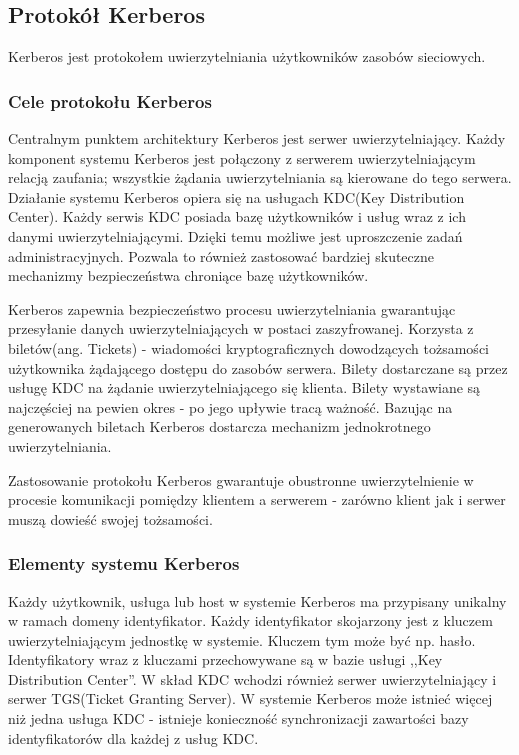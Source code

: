 	\subsection{Protokół Kerberos}

		Kerberos jest protokołem uwierzytelniania użytkowników zasobów sieciowych.

		\subsubsection{Cele protokołu Kerberos}

			Centralnym punktem architektury Kerberos jest serwer uwierzytelniający\cite{Garman03}. Każdy komponent systemu Kerberos jest połączony z serwerem uwierzytelniającym relacją zaufania; wszystkie żądania uwierzytelniania są kierowane do tego serwera. Działanie systemu Kerberos opiera się na usługach KDC(Key Distribution Center). Każdy serwis KDC posiada bazę użytkowników i usług wraz z ich danymi uwierzytelniającymi. Dzięki temu możliwe jest uproszczenie zadań administracyjnych. Pozwala to również zastosować bardziej skuteczne mechanizmy bezpieczeństwa chroniące bazę użytkowników.

			Kerberos zapewnia bezpieczeństwo procesu uwierzytelniania gwarantując przesyłanie danych uwierzytelniających w postaci zaszyfrowanej. Korzysta z biletów(ang. Tickets) - wiadomości kryptograficznych dowodzących tożsamości użytkownika żądającego dostępu do zasobów serwera. Bilety dostarczane są przez usługę KDC na żądanie uwierzytelniającego się klienta. Bilety wystawiane są najczęściej na pewien okres - po jego upływie tracą ważność. Bazując na generowanych biletach Kerberos dostarcza mechanizm jednokrotnego uwierzytelniania. 

			Zastosowanie protokołu Kerberos gwarantuje obustronne uwierzytelnienie w procesie komunikacji pomiędzy klientem a serwerem - zarówno klient jak i serwer muszą dowieść swojej tożsamości. 

		\subsubsection{Elementy systemu Kerberos}

			Każdy użytkownik, usługa lub host w systemie Kerberos ma przypisany unikalny w ramach domeny identyfikator\cite{Garman03}. Każdy identyfikator skojarzony jest z kluczem uwierzytelniającym jednostkę w systemie. Kluczem tym może być np. hasło. Identyfikatory wraz z kluczami przechowywane są w bazie usługi ,,Key Distribution Center''. W skład KDC wchodzi również serwer uwierzytelniający i serwer TGS(Ticket Granting Server). W systemie Kerberos może istnieć więcej niż jedna usługa KDC - istnieje konieczność synchronizacji zawartości bazy identyfikatorów dla każdej z usług KDC.

